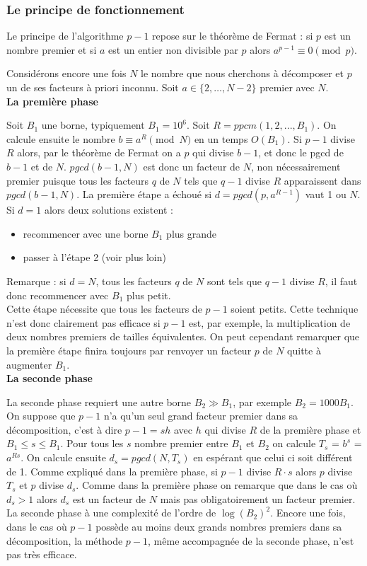\documentclass[11pt,a4paper]{article}
\begin{document}
\subsubsection{Le principe de fonctionnement}

Le principe de l'algorithme $p-1$ repose sur le théorème de Fermat : si $p$ est un nombre premier et si $a$ est un entier non divisible par $p$ alors $a^{p-1} \equiv 0 \pmod p$.
	
	 Considérons encore une fois $N$ le nombre que nous cherchons à décomposer et $p$ un de ses facteurs à priori inconnu. Soit $a \in \{2,\ldots,N-2\}$ premier avec $N$. \\

\textbf{La première phase}

Soit $B_1$ une borne, typiquement $B_1 = 10^6$. Soit $R = ppcm (1,2,...,B_1)$. On calcule ensuite le nombre $b \equiv a^{R} \pmod N$ en un temps $O(B_1)$. Si $p-1$ divise $R$ alors, par le théorème de Fermat on a $p$ qui divise $b-1$, et donc le pgcd de $b-1$ et de $N$. $pgcd(b-1, N)$ est donc un facteur de $N$, non nécessairement premier puisque tous les facteurs $q$ de $N$ tels que $q-1$ divise $R$ apparaissent dans $pgcd(b-1, N)$. La première étape a échoué si $d=pgcd(p,a^{R-1})$ vaut 1 ou $N$. Si $d = 1$ alors deux solutions existent : 
\begin{itemize}
\item recommencer avec une borne $B_1$ plus grande
\item passer à l'étape 2 (voir plus loin)
\end{itemize}
\medskip 
Remarque : si $d = N$, tous les facteurs $q$ de $N$ sont tels que $q-1$ divise $R$, il faut donc recommencer avec $B_1$ plus petit. \\
	 
Cette étape nécessite que tous les facteurs de $p-1$ soient petits. Cette technique n'est donc clairement pas efficace si $p-1$ est, par exemple, la multiplication de deux nombres premiers de tailles équivalentes. On peut cependant remarquer que la première étape finira toujours par renvoyer un facteur $p$ de $N$ quitte à augmenter $B_1$. \\

\textbf{La seconde phase}

La seconde phase requiert une autre borne $B_2 \gg B_1$, par exemple $B_2 = 1000B_1$. On suppose que $p-1$ n'a qu'un seul grand facteur premier dans sa décomposition, c'est à dire $p-1 = sh $ avec $h$ qui divise $R$ de la première phase et $B_1 \leqslant s \leqslant B_1$. Pour tous les $s$ nombre premier entre $B_1$ et $B_2$ on calcule $T_s$ = $b^s$ = $a^{Rs}$. On calcule ensuite $d_s = pgcd(N,T_s)$ en espérant que celui ci soit différent de 1. Comme expliqué dans la première phase, si $p-1$ divise $R \cdot s$ alors $p$ divise $T_s$ et $p$ divise $d_s$. Comme dans la première phase on remarque que dans le cas où $d_s > 1$ alors $d_s$ est un facteur de $N$ mais pas obligatoirement un facteur premier. La seconde phase à une complexité de l'ordre de $\log(B_2)^2$. Encore une fois, dans le cas où $p-1$ possède au moins deux grands nombres premiers dans sa décomposition, la méthode $p-1$, même accompagnée de la seconde phase, n'est pas très efficace. \\
	
\end{document}
